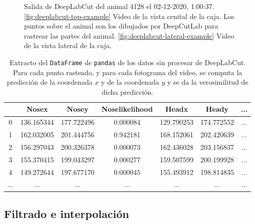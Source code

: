 \begin{figure}[]
\begin{subfigure}{0.45\textwidth}
    \caption{}
  \end{subfigure}
  \caption[Salida de DeepLabCut.]
  {Salida de DeepLabCut del animal 4128 el 02-12-2020, 1:00:37. \ref{fig:deeplabcut-top-example} Video de la vista cenital de la caja. Los puntos sobre el animal son los dibujados por DeepCutLab para rastrear las partes del animal. \ref{fig:deeplabcut-lateral-example} Video de la vista lateral de la caja.}
  \label{fig:deeplabcut-outputexamples}
\end{figure}

\begin{table}[]
  \centering
  \begin{tabular}{|c|c|c|c|c|c|c|}
  \hline
    & Nosex & Nosey & Noselikelihood & Headx & Heady & ... \\
  \hline
  0 & 136.165344 & 177.722496 & 0.000084 & 129.790253 & 174.772552 & ... \\
  1 & 162.032005 & 201.444756 & 0.942181 & 168.152061 & 202.420639 & ... \\
  2 & 156.297043 & 200.326378 & 0.000073 & 162.436028 & 203.156837 & ... \\
  3 & 155.370415 & 199.043297 & 0.000277 & 159.507599 & 200.199928 & ... \\
  4 & 149.272644 & 197.677170 & 0.000045 & 155.493912 & 198.814835 & ... \\
  ... & ... & ... & ... & ... & ... & ... \\
  \hline
  \end{tabular}
  \caption[Datos de DeepLabCut]{Extracto del \texttt{DataFrame} de \texttt{pandas} de los datos sin procesar de DeepLabCut. Para cada punto rasteado, y para cada fotograma del video, se computa la predicción de la coordenada $x$ y de la coordenada $y$ y se da la verosimilitud de dicha predicción.}
  \label{tab:df-example}
\end{table}


\subsection{Filtrado e interpolación}

